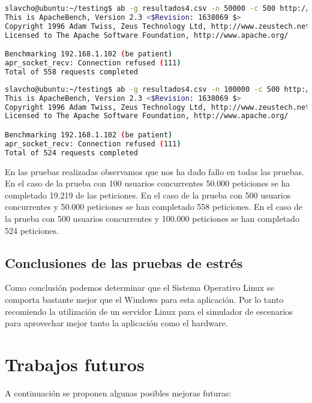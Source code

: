 \newpage

\begin{lstlisting}[language=bash]
slavcho@ubuntu:~/testing$ ab -g resultados4.csv -n 50000 -c 500 http://192.168.1.102:81/
This is ApacheBench, Version 2.3 <$Revision: 1638069 $>
Copyright 1996 Adam Twiss, Zeus Technology Ltd, http://www.zeustech.net/
Licensed to The Apache Software Foundation, http://www.apache.org/

Benchmarking 192.168.1.102 (be patient)
apr_socket_recv: Connection refused (111)
Total of 558 requests completed
\end{lstlisting}


\begin{lstlisting}[language=bash]
slavcho@ubuntu:~/testing$ ab -g resultados4.csv -n 100000 -c 500 http://192.168.1.102:81/
This is ApacheBench, Version 2.3 <$Revision: 1638069 $>
Copyright 1996 Adam Twiss, Zeus Technology Ltd, http://www.zeustech.net/
Licensed to The Apache Software Foundation, http://www.apache.org/

Benchmarking 192.168.1.102 (be patient)
apr_socket_recv: Connection refused (111)
Total of 524 requests completed
\end{lstlisting}

En las pruebas realizadas observamos que nos ha dado fallo en todas las pruebas. En el caso de la prueba con 100 usuarios concurrentes 50.000 peticiones se ha completado 19.219 de las peticiones. En el caso de la prueba con 500 usuarios concurrentes y 50.000 peticiones se han completado 558 peticiones. En el caso de la prueba con 500 usuarios concurrentes y 100.000 peticiones se han completado 524 peticiones. 

\subsection{Conclusiones de las pruebas de estrés}

Como conclusión podemos determinar que el Sistema Operativo Linux se comporta bastante mejor que el Windows para esta aplicación. Por lo tanto recomiendo la utilización de un servidor Linux para el simulador de escenarios para aprovechar mejor tanto la aplicación como el hardware.

\section{Trabajos futuros}

A continuación se proponen algunas posibles mejoras futuras:

